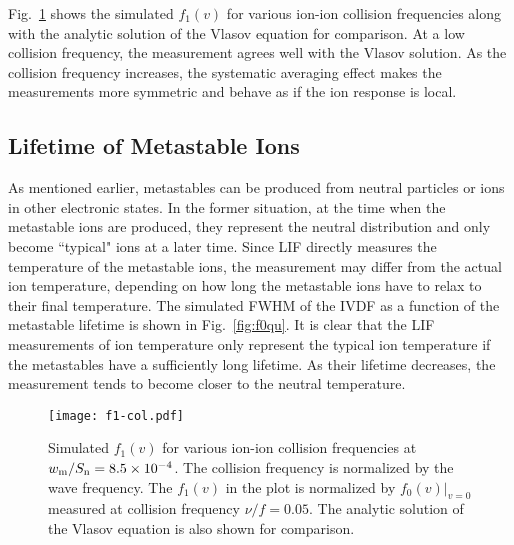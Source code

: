 \documentclass[aip,pop,reprint]{revtex4-1}
\begin{document}
Fig.~\ref{fig:f1col} shows the simulated $f_1(v)$ for various ion-ion collision frequencies along with the analytic solution of the Vlasov equation for comparison. At a low collision frequency, the measurement agrees well with the Vlasov solution. As the collision frequency increases, the systematic averaging effect makes the measurements more symmetric and behave as if the ion response is local. 

\subsection{Lifetime of Metastable Ions}

As mentioned earlier, metastables can be produced from neutral particles or ions in other electronic states. In the former situation, at the time when the metastable ions are produced, they represent the neutral distribution and only become ``typical" ions at a later time. Since LIF directly measures the temperature of the metastable ions, the measurement may differ from the actual ion temperature, depending on how long the metastable ions have to relax to their final temperature. The simulated FWHM of the IVDF as a function of the metastable lifetime is shown in Fig.~\ref{fig:f0qu}. It is clear that the LIF measurements of ion temperature only represent the typical ion temperature if the metastables have a sufficiently long lifetime. As their lifetime decreases, the measurement tends to become closer to the neutral temperature.

\begin{figure}
\begin{center}
\texttt{[image: f1-col.pdf]}
\caption{Simulated $f_1(v)$ for various ion-ion collision frequencies at $w_\textup{m}/S_\textup{n}=8.5\times10^{-4}$. The collision frequency is normalized by the wave frequency. The $f_1(v)$ in the plot is normalized by $f_0(v)|_{v=0}$ measured at collision frequency $\nu /f=0.05$. The analytic solution of the Vlasov equation is also shown for comparison.}
\label{fig:f1col}
\end{center}
\end{figure}

\end{document}
